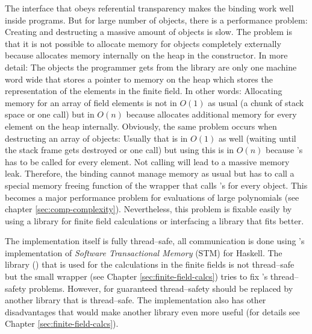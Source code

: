 The interface that obeys referential transparency makes the binding work well
inside \JWThaskell{} programs. But for large number of \JWTntl{} objects, there
is a performance problem: Creating and destructing a massive amount of objects
is slow. The problem is that it is not possible to allocate memory for \JWTntl{}
objects completely externally because \JWTntl{} allocates memory internally on
the heap in the constructor. In more detail: The objects the programmer gets
from the \JWTntl{} library are only one machine word wide that stores a pointer
to memory on the heap which stores the representation of the elements in the
finite field. In other words: Allocating memory for an array of field elements
is not in $O(1)$ as usual (a chunk of stack space or one  call)
but in $O(n)$ because \JWTntl{} allocates additional memory for every element on
the heap internally. Obviously, the same problem occurs when destructing an
array of \JWTntl{} objects: Usually that is in $O(1)$ as well (waiting until the
stack frame gets destroyed or one  call) but using \JWTntl{} this
is in $O(n)$ because \JWTcpp{}'s  has to be called for every
element. Not calling  will lead to a massive memory leak.
Therefore, the \JWThaskell{} binding cannot manage memory as usual but has to
call a special memory freeing function of the \JWTc{} wrapper that calls
\JWTcpp{}'s  for every object. This becomes a major performance
problem for evaluations of large polynomials (see chapter
\ref{sec:comp-complexity}). Nevertheless, this problem is fixable easily by
using a \JWThaskell{} library for finite field calculations or interfacing a
library that fits better.



The implementation itself is fully thread--safe, all communication is done using
\JWTghc{}'s implementation of \emph{Software Transactional Memory} (STM)
\cite{stm05} for Haskell. The library (\JWTntl{}) that is used for the
calculations in the finite fields is not thread--safe but the small \JWTc{}
wrapper (see Chapter \ref{sec:finite-field-calcs}) tries to fix \JWTntl{}'s
thread--safety problems. However, for guaranteed thread--safety \JWTntl{} should
be replaced by another library that is thread--safe. The \JWTntl{}
implementation also has other disadvantages that would make another library even
more useful (for details see Chapter \ref{sec:finite-field-calcs}).




